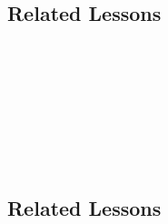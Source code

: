 \subsection{Related Lessons}
\fourhOne{}\\
\fourhTwo{}\\
\fourhThree{}\\
\fourhFour{}\\
\fourhFive{}\\
\fourFKFourtySeven{}\\
\fourjFifteen{}\\
%
\subsection{Related Lessons}
\fouraTen{}\\
\fourhOne{}\\
\fourhTwo{}\\
\fourhThree{}\\
\fourhFour{}\\
\fourhFive{}\\
